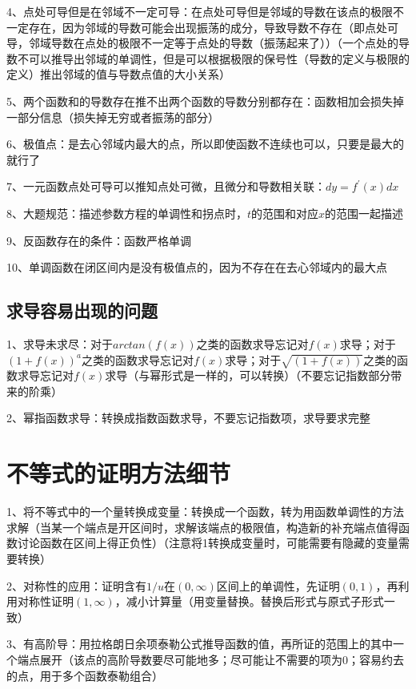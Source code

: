 4、点处可导但是在邻域不一定可导：在点处可导但是邻域的导数在该点的极限不一定存在，因为邻域的导数可能会出现振荡的成分，导致导数不存在（即点处可导，邻域导数在点处的极限不一定等于点处的导数（振荡起来了））（一个点处的导数不可以推导出邻域的单调性，但是可以根据极限的保号性（导数的定义与极限的定义）推出邻域的值与导数点值的大小关系）

5、两个函数和的导数存在推不出两个函数的导数分别都存在：函数相加会损失掉一部分信息（损失掉无穷或者振荡的部分）

6、极值点：是去心邻域内最大的点，所以即使函数不连续也可以，只要是最大的就行了

7、一元函数点处可导可以推知点处可微，且微分和导数相关联：$dy=f^{\prime}(x)dx$

8、大题规范：描述参数方程的单调性和拐点时，$t$的范围和对应$x$的范围一起描述

9、反函数存在的条件：函数严格单调

10、单调函数在闭区间内是没有极值点的，因为不存在在去心邻域内的最大点



\subsection{求导容易出现的问题}

1、求导未求尽：对于$arctan(f(x))$之类的函数求导忘记对$f(x)$求导；对于$(1+f(x))^{a}$之类的函数求导忘记对$f(x)$求导；对于$\sqrt{(1+f(x))}$之类的函数求导忘记对$f(x)$求导（与幂形式是一样的，可以转换）（不要忘记指数部分带来的阶乘）

2、幂指函数求导：转换成指数函数求导，不要忘记指数项，求导要求完整

\section{不等式的证明方法细节}

1、将不等式中的一个量转换成变量：转换成一个函数，转为用函数单调性的方法求解（当某一个端点是开区间时，求解该端点的极限值，构造新的补充端点值得函数讨论函数在区间上得正负性）（注意将1转换成变量时，可能需要有隐藏的变量需要转换）

2、对称性的应用：证明含有$1/u$在$(0,\infty)$区间上的单调性，先证明$(0,1)$，再利用对称性证明$(1,\infty)$，减小计算量（用变量替换。替换后形式与原式子形式一致）

3、有高阶导：用拉格朗日余项泰勒公式推导函数的值，再所证的范围上的其中一个端点展开（该点的高阶导数要尽可能地多；尽可能让不需要的项为0；容易约去的点，用于多个函数泰勒组合）

